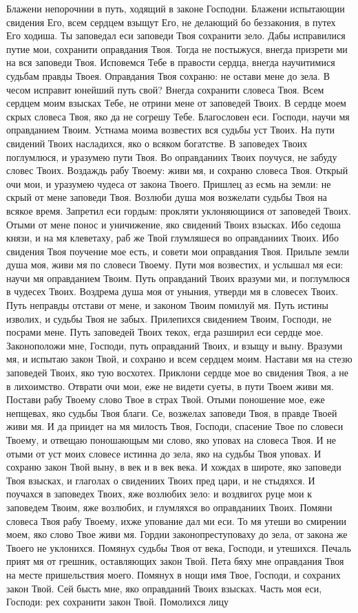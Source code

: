 \begin{mymulticols}
Блажени непорочнии в путь, ходящий в законе Господни. Блажени испытающии свидения Его, всем сердцем взыщут Его, не делающий бо беззакония, в путех Его ходиша. Ты заповедал еси заповеди Твоя сохранити зело. Дабы исправилися путие мои, сохранити оправдания Твоя. Тогда не постыжуся, внегда призрети ми на вся заповеди Твоя. Исповемся Тебе в правости сердца, внегда научитимися судьбам правды Твоея. Оправдания Твоя сохраню: не остави мене до зела. В чесом исправит юнейший путь свой? Внегда сохранити словеса Твоя. Всем сердцем моим взысках Тебе, не отрини мене от заповедей Твоих. В сердце моем скрых словеса Твоя, яко да не согрешу Тебе. Благословен еси. Господи, научи мя оправданием Твоим. Устнама моима возвестих вся судьбы уст Твоих. На пути свидений Твоих насладихся, яко о всяком богатстве. В заповедех Твоих поглумлюся, и уразумею пути Твоя. Во оправданиих Твоих поучуся, не забуду словес Твоих. Воздаждь рабу Твоему: живи мя, и сохраню словеса Твоя. Открый очи мои, и уразумею чудеса от закона Твоего. Пришлец аз есмь на земли: не скрый от мене заповеди Твоя. Возлюби душа моя возжелати судьбы Твоя на всякое время. Запретил еси гордым: прокляти уклоняющиися от заповедей Твоих. Отыми от мене понос и уничижение, яко свидений Твоих взысках. Ибо седоша князи, и на мя клеветаху, раб же Твой глумляшеся во оправданиих Твоих. Ибо свидения Твоя поучение мое есть, и совети мои оправдания Твоя. Прильпе земли душа моя, живи мя по словеси Твоему. Пути моя возвестих, и услышал мя еси: научи мя оправданием Твоим. Путь оправданий Твоих вразуми ми, и поглумлюся в чудесех Твоих. Воздрема душа моя от уныния, утверди мя в словесех Твоих. Путь неправды отстави от мене, и законом Твоим помилуй мя. Путь истины изволих, и судьбы Твоя не забых. Прилепихся свидением Твоим, Господи, не посрами мене. Путь заповедей Твоих текох, егда разширил еси сердце мое. Законоположи мне, Господи, путь оправданий Твоих, и взыщу и выну. Вразуми мя, и испытаю закон Твой, и сохраню и всем сердцем моим. Настави мя на стезю заповедей Твоих, яко тую восхотех. Приклони сердце мое во свидения Твоя, а не в лихоимство. Отврати очи мои, еже не видети суеты, в пути Твоем живи мя. Постави рабу Твоему слово Твое в страх Твой. Отыми поношение мое, еже непщевах, яко судьбы Твоя благи. Се, возжелах заповеди Твоя, в правде Твоей живи мя. И да приидет на мя милость Твоя, Господи, спасение Твое по словеси Твоему, и отвещаю поношающым ми слово, яко уповах на словеса Твоя. И не отыми от уст моих словесе истинна до зела, яко на судьбы Твоя уповах. И сохраню закон Твой выну, в век и в век века. И хождах в широте, яко заповеди Твоя взысках, и глаголах о свидениих Твоих пред цари, и не стыдяхся. И поучахся в заповедех Твоих, яже возлюбих зело: и воздвигох руце мои к заповедем Твоим, яже возлюбих, и глумляхся во оправданиих Твоих. Помяни словеса Твоя рабу Твоему, ихже упование дал ми еси. То мя утеши во смирении моем, яко слово Твое живи мя. Гордии законопреступоваху до зела, от закона же Твоего не уклонихся. Помянух судьбы Твоя от века, Господи, и утешихся. Печаль прият мя от грешник, оставляющих закон Твой. Пета бяху мне оправдания Твоя на месте пришельствия моего. Помянух в нощи имя Твое, Господи, и сохраних закон Твой. Сей бысть мне, яко оправданий Твоих взысках. Часть моя еси, Господи: рех сохранити закон Твой. Помолихся лицу 
\end{mymulticols}
